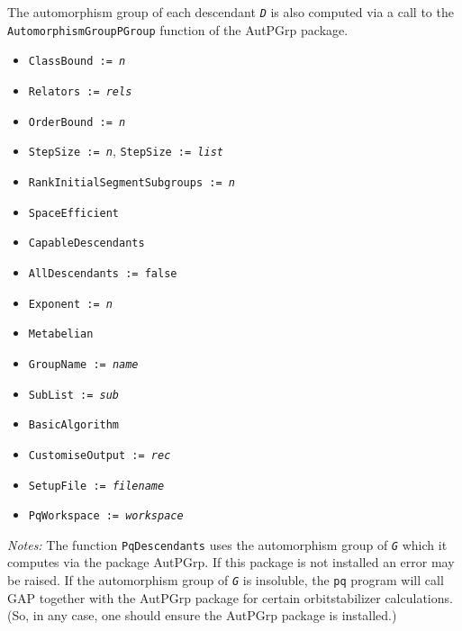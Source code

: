 \documentclass[a4paper,11pt]{report}
\begin{document}
{{{ The automorphism group of each descendant \mbox{\texttt{\mdseries\slshape D}} is also computed via a call to the \texttt{AutomorphismGroupPGroup} function of the \textsf{AutPGrp} package.      
\begin{itemize}
\item  \texttt{ClassBound := \mbox{\texttt{\mdseries\slshape n}}} 
\item  \texttt{Relators := \mbox{\texttt{\mdseries\slshape rels}}} 
\item  \texttt{OrderBound := \mbox{\texttt{\mdseries\slshape n}}} 
\item  \texttt{StepSize := \mbox{\texttt{\mdseries\slshape n}}}, \texttt{StepSize := \mbox{\texttt{\mdseries\slshape list}}}  
\item  \texttt{RankInitialSegmentSubgroups := \mbox{\texttt{\mdseries\slshape n}}} 
\item  \texttt{SpaceEfficient} 
\item  \texttt{CapableDescendants} 
\item  \texttt{AllDescendants := false} 
\item  \texttt{Exponent := \mbox{\texttt{\mdseries\slshape n}}} 
\item  \texttt{Metabelian} 
\item  \texttt{GroupName := \mbox{\texttt{\mdseries\slshape name}}} 
\item  \texttt{SubList := \mbox{\texttt{\mdseries\slshape sub}}} 
\item  \texttt{BasicAlgorithm} 
\item  \texttt{CustomiseOutput := \mbox{\texttt{\mdseries\slshape rec}}} 
\item  \texttt{SetupFile := \mbox{\texttt{\mdseries\slshape filename}}} 
\item  \texttt{PqWorkspace := \mbox{\texttt{\mdseries\slshape workspace}}} 
\end{itemize}
 \emph{Notes:} The function \texttt{PqDescendants} uses the automorphism group of \mbox{\texttt{\mdseries\slshape G}} which it computes via the package \textsf{AutPGrp}. If this package is not installed an error may be raised. If the automorphism
group of \mbox{\texttt{\mdseries\slshape G}} is insoluble, the \texttt{pq} program will call \textsf{GAP} together with the \textsf{AutPGrp} package for certain orbit\texttt{}stabilizer calculations. (So, in
any case, one should ensure the \textsf{AutPGrp} package is installed.) 

}}}
\end{document}

